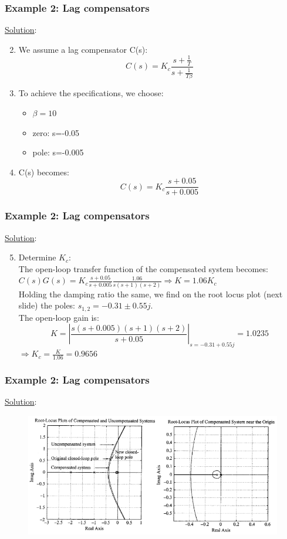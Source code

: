 \begin{frame}
	\frametitle{Example 2: Lag compensators}
	\underline{Solution}:
	\begin{enumerate}
		\setcounter{enumi}{1}
		\item We assume a lag compensator C(s): $$C(s)=K_c\frac{s+\frac{1}{T}}{s+\frac{1}{T\beta}}$$
		\item To achieve the specifications, we choose: 
		\begin{itemize}
			\item $\beta=10$
			\item zero: s=-0.05
			\item pole: s=-0.005
		\end{itemize}
		\item C(s) becomes: 
		$$C(s)=K_c\frac{s+0.05}{s+0.005}$$
	\end{enumerate}
\end{frame}

\begin{frame}
	\frametitle{Example 2: Lag compensators}
	\underline{Solution}:
	\begin{enumerate}
		\setcounter{enumi}{4}
		\item Determine $K_c$:\\
		The open-loop transfer function of the compensated system becomes:\\
		$C(s)G(s)=K_c\frac{s+0.05}{s+0.005}\frac{1.06}{s(s+1)(s+2)} \Rightarrow K=1.06K_c$\\
		Holding the damping ratio the same, we find on the root locus plot (next slide) the poles: $s_{1,2}=-0.31\pm0.55j$.\\
		The open-loop gain is:
		$$K=|\frac{s(s+0.005)(s+1)(s+2)}{s+0.05}|_{s=-0.31+0.55j}=1.0235$$
		$\Rightarrow K_c=\frac{K}{1.06}=0.9656$
	\end{enumerate}
\end{frame}

\begin{frame}
	\frametitle{Example 2: Lag compensators}
	\underline{Solution}:
			\begin{figure}
				\centering
				\includegraphics[width=1\linewidth]{Ex2_rootlocusnew}
			\end{figure}
\end{frame}

